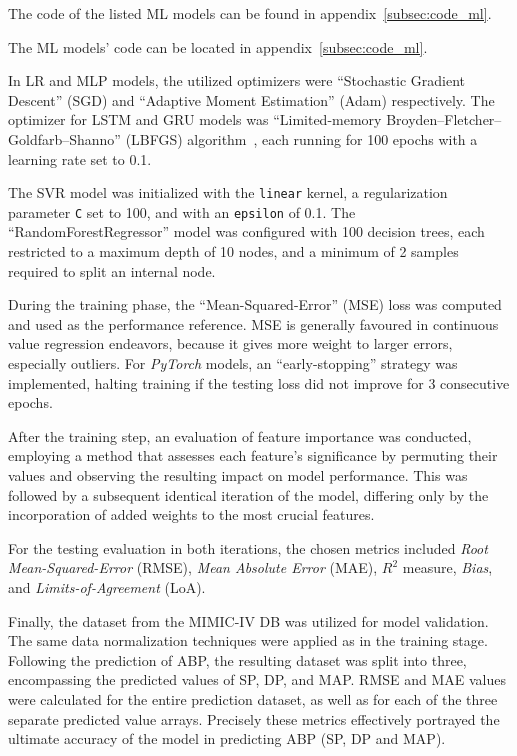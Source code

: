 The code of the listed ML models can be found in appendix~\ref{subsec:code_ml}.


The ML models' code can be located in appendix~\ref{subsec:code_ml}.

In LR and MLP models, the utilized optimizers were \enquote{Stochastic Gradient Descent} (SGD)\cite{SGDPyTorchDocumentation} and \enquote{Adaptive Moment Estimation} (Adam)\cite{AdamPyTorchDocumentation} respectively.
The optimizer for LSTM and GRU models was \enquote{Limited-memory Broyden–Fletcher–Goldfarb–Shanno} (LBFGS) algorithm~\cite{LBFGSPyTorchDocumentation}, each running for 100 epochs with a learning rate set to 0.1.

The SVR model was initialized with the \texttt{linear} kernel, a regularization parameter \texttt{C} set to 100, and with an \texttt{epsilon} of 0.1.
The \enquote{RandomForestRegressor} model was configured with 100 decision trees, each restricted to a maximum depth of 10 nodes, and a minimum of 2 samples required to split an internal node.

During the training phase, the \enquote{Mean-Squared-Error} (MSE) loss was computed and used as the performance reference.
MSE is generally favoured in continuous value regression endeavors, because it gives more weight to larger errors, especially outliers.
For \textit{PyTorch} models, an \enquote{early-stopping} strategy was implemented, halting training if the testing loss did not improve for 3 consecutive epochs.

After the training step, an evaluation of feature importance was conducted, employing a method that assesses each feature's significance by permuting their values and observing the resulting impact on model performance.
This was followed by a subsequent identical iteration of the model, differing only by the incorporation of added weights to the most crucial features.

For the testing evaluation in both iterations, the chosen metrics included \textit{Root Mean-Squared-Error} (RMSE), \textit{Mean Absolute Error} (MAE), \textit{$R^2$} measure, \textit{Bias}, and \textit{Limits-of-Agreement} (LoA).

Finally, the dataset from the MIMIC-IV DB was utilized for model validation.
The same data normalization techniques were applied as in the training stage.
Following the prediction of ABP, the resulting dataset was split into three, encompassing the predicted values of SP, DP, and MAP\@.
RMSE and MAE values were calculated for the entire prediction dataset, as well as for each of the three separate predicted value arrays.
Precisely these metrics effectively portrayed the ultimate accuracy of the model in predicting ABP (SP, DP and MAP).
